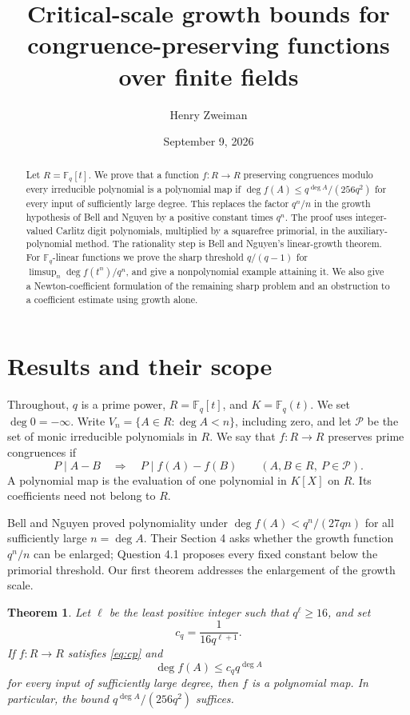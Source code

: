 \documentclass[11pt]{article}
\title{Critical-scale growth bounds for congruence-preserving functions over finite fields}
\author{Henry Zweiman}
\date{September 9, 2026}
\newtheorem{theorem}{Theorem}[section]
\newcommand{\F}{\mathbb F}
\newcommand{\PP}{\mathcal P}
\begin{document}
\maketitle
\begin{abstract}
Let $R=\F_q[t]$. We prove that a function $f:R\to R$ preserving congruences
modulo every irreducible polynomial is a polynomial map if
$\deg f(A)\le q^{\deg A}/(256q^2)$ for every input of sufficiently large
degree. This replaces the factor $q^n/n$ in the growth hypothesis of
Bell and Nguyen by a positive constant times $q^n$. The proof uses
integer-valued Carlitz digit polynomials, multiplied by a squarefree
primorial, in the auxiliary-polynomial method. The rationality step is
Bell and Nguyen's linear-growth theorem. For $\F_q$-linear functions we
prove the sharp threshold $q/(q-1)$ for
$\limsup_n\deg f(t^n)/q^n$, and give a nonpolynomial example attaining it.
We also give a Newton-coefficient formulation of the remaining sharp
problem and an obstruction to a coefficient estimate using growth alone.
\end{abstract}

\section{Results and their scope}
Throughout, $q$ is a prime power, $R=\F_q[t]$, and $K=\F_q(t)$.
We set $\deg 0=-\infty$. Write $V_n=\{A\in R:\deg A<n\}$, including
zero, and let $\PP$ be the set of monic irreducible polynomials in $R$.
We say that $f:R\to R$ preserves prime congruences if
\begin{equation}\label{eq:cp}
 P\mid A-B\quad\Longrightarrow\quad P\mid f(A)-f(B)
 \qquad(A,B\in R,\ P\in\PP).
\end{equation}
A polynomial map is the evaluation of one polynomial in $K[X]$ on $R$.
Its coefficients need not belong to $R$.

Bell and Nguyen \cite[Theorem 1.4]{BN} proved polynomiality under
$\deg f(A)<q^n/(27qn)$ for all sufficiently large $n=\deg A$.
Their Section 4 asks whether the growth function $q^n/n$ can be enlarged;
Question 4.1 proposes every fixed constant below the primorial threshold.
Our first theorem addresses the enlargement of the growth scale.

\begin{theorem}\label{thm:general}
Let $\ell$ be the least positive integer such that $q^\ell\ge16$, and set
\[
 c_q=\frac1{16q^{\ell+1}}.
\]
If $f:R\to R$ satisfies \eqref{eq:cp} and
\begin{equation}\label{eq:growth}
 \deg f(A)\le c_q q^{\deg A}
\end{equation}
for every input of sufficiently large degree, then $f$ is a polynomial map.
In particular, the bound $q^{\deg A}/(256q^2)$ suffices.
\end{theorem}
\end{document}
